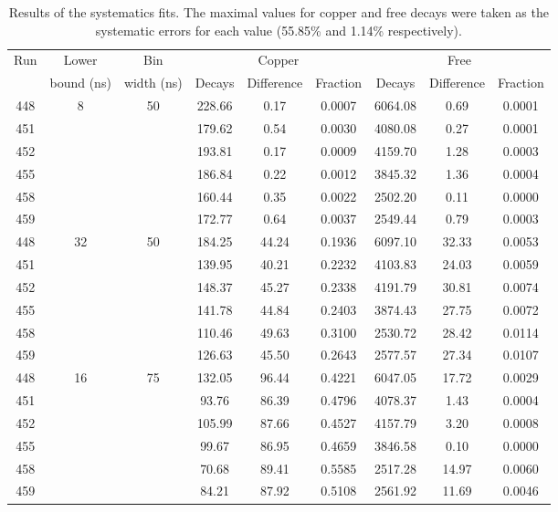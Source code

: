 \begin{table}
  \begin{center}
  \begin{tabular}{c | c | c | c | c | c | c | c | c}
    \multirow{2}{*}{Run}  &  
          Lower       &  Bin         &  \multicolumn{3}{c|}{Copper}     & \multicolumn{3}{c}{Free}       \\
       &  bound (ns)  &  width (ns)  &  Decays & Difference & Fraction  & Decays & Difference & Fraction \\
    \hline
     448  &  \multirow{6}{*}{8}  &  \multirow{6}{*}{50}
              &  228.66  &    0.17  &  0.0007  &  6064.08  &    0.69  &  0.0001 \\ 
     451  & & &  179.62  &    0.54  &  0.0030  &  4080.08  &    0.27  &  0.0001 \\ 
     452  & & &  193.81  &    0.17  &  0.0009  &  4159.70  &    1.28  &  0.0003 \\ 
     455  & & &  186.84  &    0.22  &  0.0012  &  3845.32  &    1.36  &  0.0004 \\ 
     458  & & &  160.44  &    0.35  &  0.0022  &  2502.20  &    0.11  &  0.0000 \\ 
     459  & & &  172.77  &    0.64  &  0.0037  &  2549.44  &    0.79  &  0.0003 \\ 
    \hline
    448  &  \multirow{6}{*}{32}  &  \multirow{6}{*}{50}
             &  184.25  &   44.24  &  0.1936  &  6097.10  &   32.33  &  0.0053 \\ 
    451  & & &  139.95  &   40.21  &  0.2232  &  4103.83  &   24.03  &  0.0059 \\ 
    452  & & &  148.37  &   45.27  &  0.2338  &  4191.79  &   30.81  &  0.0074 \\ 
    455  & & &  141.78  &   44.84  &  0.2403  &  3874.43  &   27.75  &  0.0072 \\ 
    458  & & &  110.46  &   49.63  &  0.3100  &  2530.72  &   28.42  &  0.0114 \\ 
    459  & & &  126.63  &   45.50  &  0.2643  &  2577.57  &   27.34  &  0.0107 \\
    \hline
    448  &  \multirow{6}{*}{16}  &  \multirow{6}{*}{75}
             &  132.05  &   96.44  &  0.4221  &  6047.05  &   17.72  &  0.0029 \\ 
    451  & & &   93.76  &   86.39  &  0.4796  &  4078.37  &    1.43  &  0.0004 \\ 
    452  & & &  105.99  &   87.66  &  0.4527  &  4157.79  &    3.20  &  0.0008 \\ 
    455  & & &   99.67  &   86.95  &  0.4659  &  3846.58  &    0.10  &  0.0000 \\ 
    458  & & &   70.68  &   89.41  &  0.5585  &  2517.28  &   14.97  &  0.0060 \\ 
    459  & & &   84.21  &   87.92  &  0.5108  &  2561.92  &   11.69  &  0.0046 \\
  \end{tabular}
  \end{center}
  \caption{Results of the systematics fits. The maximal values for copper and free decays were taken as the systematic errors for each value (55.85\% and 1.14\% respectively).}
  \label{tab:systematic_fits}
\end{table}

